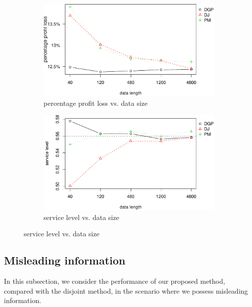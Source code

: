 \documentclass{article}
\begin{document}
\begin{figure}[ht]
\centering
\caption{Performance vs. data size with nonlinear profit function}
\begin{subfigure}[b]{0.48\textwidth}
\centering
\includegraphics[width=\textwidth]{nonlinear-plot_files/figure-latex/ppl-1.pdf}
\caption{percentage profit loss vs. data size}
\end{subfigure}
\hfill
\begin{subfigure}[b]{0.48\textwidth}
\centering
\includegraphics[width=\textwidth]{nonlinear-plot_files/figure-latex/sl-1.pdf}
\caption{service level vs. data size}
\end{subfigure}
\label{fig:non}
\end{figure}


\subsection{Misleading information}
In this subsection, we consider the performance of our proposed method, compared with the disjoint method, in the scenario where we possess misleading information. 
\end{document}
